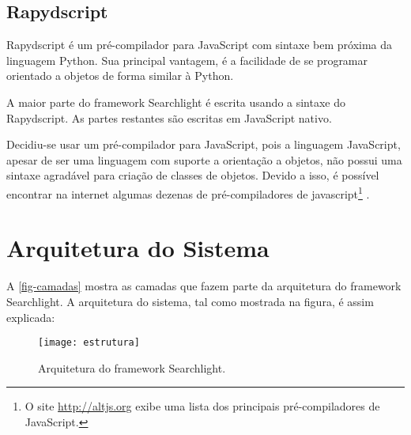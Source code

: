 \subsection{Rapydscript}

Rapydscript \cite{rapydscript} é um pré-compilador para JavaScript com sintaxe bem próxima da linguagem Python. Sua principal vantagem, é a facilidade de se programar orientado a objetos de forma similar à Python. 

A maior parte do framework Searchlight é escrita usando a sintaxe do Rapydscript. As partes restantes são escritas em JavaScript nativo.

Decidiu-se usar um pré-compilador para JavaScript,  pois a linguagem JavaScript, apesar de ser uma linguagem com suporte a orientação a objetos, não possui uma sintaxe agradável para criação de classes de objetos. Devido a isso, é possível encontrar na internet algumas dezenas de pré-compiladores de javascript\footnote{O site \url{http://altjs.org} exibe uma lista dos principais pré-compiladores de JavaScript.}
. 


\section{Arquitetura do Sistema}
A \autoref{fig-camadas} mostra as camadas que fazem parte da arquitetura do framework Searchlight. A arquitetura do sistema, tal como mostrada na figura, é assim explicada:
	\begin{figure}[htb]
	\caption{\label{fig-camadas}Arquitetura do framework Searchlight.}
	\begin{center}
	    \texttt{[image: estrutura]}
	\end{center}
\end{figure}

